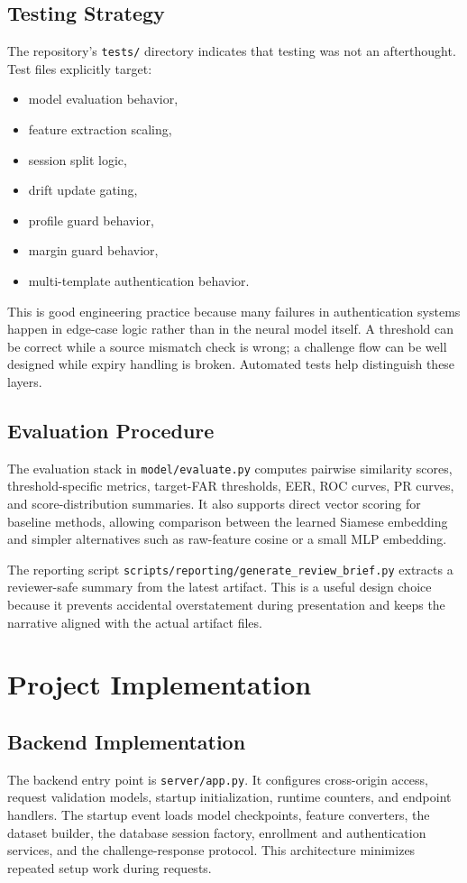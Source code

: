 \documentclass[12pt]{report}
\begin{document}
\section{Testing Strategy}
The repository's \texttt{tests/} directory indicates that testing was not an afterthought. Test files explicitly target:
\begin{itemize}[leftmargin=1.2cm]
\item model evaluation behavior,
\item feature extraction scaling,
\item session split logic,
\item drift update gating,
\item profile guard behavior,
\item margin guard behavior,
\item multi-template authentication behavior.
\end{itemize}

This is good engineering practice because many failures in authentication systems happen in edge-case logic rather than in the neural model itself. A threshold can be correct while a source mismatch check is wrong; a challenge flow can be well designed while expiry handling is broken. Automated tests help distinguish these layers.

\section{Evaluation Procedure}
The evaluation stack in \texttt{model/evaluate.py} computes pairwise similarity scores, threshold-specific metrics, target-FAR thresholds, EER, ROC curves, PR curves, and score-distribution summaries. It also supports direct vector scoring for baseline methods, allowing comparison between the learned Siamese embedding and simpler alternatives such as raw-feature cosine or a small MLP embedding.

The reporting script \texttt{scripts/reporting/generate\_review\_brief.py} extracts a reviewer-safe summary from the latest artifact. This is a useful design choice because it prevents accidental overstatement during presentation and keeps the narrative aligned with the actual artifact files.

\chapter{Project Implementation}
\section{Backend Implementation}
The backend entry point is \texttt{server/app.py}. It configures cross-origin access, request validation models, startup initialization, runtime counters, and endpoint handlers. The startup event loads model checkpoints, feature converters, the dataset builder, the database session factory, enrollment and authentication services, and the challenge-response protocol. This architecture minimizes repeated setup work during requests.
\end{document}
